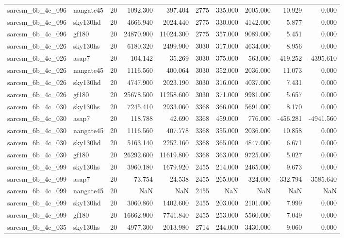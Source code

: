\begin{longtable}{llrrrrrrrr}
sarcsm\_6b\_4c\_096 & nangate45 & 20 & 1092.300 & 397.404 & 2775 & 335.000 & 2005.000 & 10.929 & 0.000 \\
sarcsm\_6b\_4c\_096 & sky130hd & 20 & 4666.940 & 2024.440 & 2775 & 330.000 & 4142.000 & 5.877 & 0.000 \\
sarcsm\_6b\_4c\_096 & gf180 & 20 & 24870.900 & 11024.300 & 2775 & 357.000 & 9089.000 & 5.451 & 0.000 \\
sarcsm\_6b\_4c\_026 & sky130hs & 20 & 6180.320 & 2499.900 & 3030 & 317.000 & 4634.000 & 8.956 & 0.000 \\
sarcsm\_6b\_4c\_026 & asap7 & 20 & 104.142 & 35.269 & 3030 & 375.000 & 563.000 & -419.252 & -4395.610 \\
sarcsm\_6b\_4c\_026 & nangate45 & 20 & 1116.560 & 400.064 & 3030 & 352.000 & 2036.000 & 11.073 & 0.000 \\
sarcsm\_6b\_4c\_026 & sky130hd & 20 & 4747.900 & 2023.190 & 3030 & 316.000 & 4037.000 & 7.431 & 0.000 \\
sarcsm\_6b\_4c\_026 & gf180 & 20 & 25678.500 & 11258.600 & 3030 & 371.000 & 9981.000 & 5.657 & 0.000 \\
sarcsm\_6b\_4c\_030 & sky130hs & 20 & 7245.410 & 2933.060 & 3368 & 366.000 & 5691.000 & 8.170 & 0.000 \\
sarcsm\_6b\_4c\_030 & asap7 & 20 & 118.788 & 42.690 & 3368 & 459.000 & 776.000 & -456.281 & -4941.560 \\
sarcsm\_6b\_4c\_030 & nangate45 & 20 & 1116.560 & 407.778 & 3368 & 355.000 & 2036.000 & 10.858 & 0.000 \\
sarcsm\_6b\_4c\_030 & sky130hd & 20 & 5163.140 & 2252.160 & 3368 & 365.000 & 4847.000 & 6.671 & 0.000 \\
sarcsm\_6b\_4c\_030 & gf180 & 20 & 26292.600 & 11619.800 & 3368 & 363.000 & 9725.000 & 5.027 & 0.000 \\
sarcsm\_6b\_4c\_099 & sky130hs & 20 & 3960.180 & 1679.920 & 2455 & 214.000 & 2465.000 & 9.673 & 0.000 \\
sarcsm\_6b\_4c\_099 & asap7 & 20 & 73.754 & 24.538 & 2455 & 265.000 & 324.000 & -332.794 & -3585.640 \\
sarcsm\_6b\_4c\_099 & nangate45 & 20 & NaN & NaN & 2455 & NaN & NaN & NaN & NaN \\
sarcsm\_6b\_4c\_099 & sky130hd & 20 & 3060.860 & 1402.600 & 2455 & 203.000 & 2101.000 & 7.999 & 0.000 \\
sarcsm\_6b\_4c\_099 & gf180 & 20 & 16662.900 & 7741.840 & 2455 & 253.000 & 5560.000 & 7.049 & 0.000 \\
sarcsm\_6b\_4c\_035 & sky130hs & 20 & 4977.300 & 2013.980 & 2714 & 244.000 & 3430.000 & 9.060 & 0.000 \\

\end{longtable}

